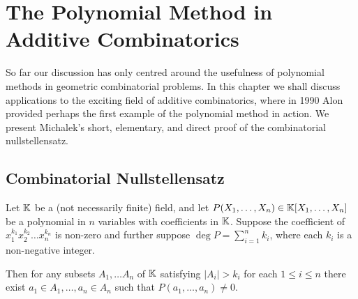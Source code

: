 \chapter{The Polynomial Method in Additive Combinatorics}
So far our discussion has only centred around the usefulness of polynomial methods in geometric combinatorial problems. 
In this chapter we shall discuss applications to the exciting field of additive combinatorics, where in 1990 Alon provided perhaps
the first example of the polynomial method in action.\cite{alon1999combinatorial} We present Michalek's short, elementary, and direct proof of the combinatorial nullstellensatz.\cite{michalek2010}
\section{Combinatorial Nullstellensatz}
\begin{theorem}
    Let $\mathbb K$ be a (not necessarily finite) field, and let $P(X_1,\dots, X_n) \in \mathbb K[X_1,\dots, X_n]$ be a polynomial in $n$ variables with coefficients in $\mathbb K$. Suppose the coefficient of $x_1^{k_1}x_2^{k_2}\dots x_n^{k_n}$ is non-zero and further suppose $\deg P = \sum_{i=1}^n k_i$, where each $k_i$ is a non-negative integer.

    Then for any subsets $A_1,\dots A_n$ of $\mathbb K$ satisfying $|A_i| > k_i$ for each $1\leq i\leq n$ there exist $a_1 \in A_1, \dots, a_n \in A_n$ such that $P(a_1,\dots, a_n) \neq 0$.
    \label{comb-nullstellensatz}
\end{theorem}
